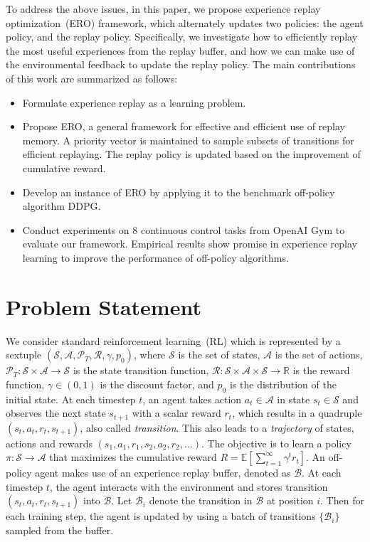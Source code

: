 \documentclass{article}
\begin{document}
To address the above issues, in this paper, we propose experience replay optimization~(ERO) framework, which alternately updates two policies: the agent policy, and the replay policy. Specifically, we investigate how to efficiently replay the most useful experiences from the replay buffer, and how we can make use of the environmental feedback to update the replay policy. The main contributions of this work are summarized as follows:

\begin{itemize}
  \item Formulate experience replay as a learning problem.
  \item Propose ERO, a general framework for effective and efficient use of replay memory. A priority vector is maintained to sample subsets of transitions for efficient replaying. The replay policy is updated based on the improvement of cumulative reward.
  \item Develop an instance of ERO by applying it to the benchmark off-policy algorithm DDPG.
  \item Conduct experiments on $8$ continuous control tasks from OpenAI Gym to evaluate our framework. Empirical results show promise in experience replay learning to improve the performance of off-policy algorithms.
\end{itemize}


\section{Problem Statement}
We consider standard reinforcement learning~(RL) which is represented by a sextuple $(\mathcal{S}, \mathcal{A}, \mathcal{P}_T, \mathcal{R}, \gamma, p_0)$, where $\mathcal{S}$ is the set of states, $\mathcal{A}$ is the set of actions, $\mathcal{P}_T: \mathcal{S} \times \mathcal{A} \to \mathcal{S}$ is the state transition function, $\mathcal{R}: \mathcal{S} \times \mathcal{A} \times \mathcal{S} \to \mathbb{R}$ is the reward function, $\gamma \in (0, 1)$ is the discount factor, and $p_0$ is the distribution of the initial state. At each timestep $t$, an agent takes action $a_t \in \mathcal{A}$ in state $s_t \in \mathcal{S}$ and observes the next state $s_{t+1}$ with a scalar reward $r_t$, which results in a quadruple $(s_t, a_t, r_t, s_{t+1})$, also called \emph{transition}. This also leads to a \emph{trajectory} of states, actions and rewards $(s_1, a_1, r_1, s_2, a_2, r_2, ...)$. The objective is to learn a policy $\pi: \mathcal{S} \to \mathcal{A}$ that maximizes the cumulative reward $R = \mathbb{E}[\sum_{t=1}^{\infty}\gamma^t r_t]$. An off-policy agent makes use of an experience replay buffer, denoted as $\mathcal{B}$. At each timestep $t$, the agent interacts with the environment and stores transition $(s_t, a_t, r_t, s_{t+1})$ into $\mathcal{B}$. Let $\mathcal{B}_i$ denote the transition in $\mathcal{B}$ at position $i$. Then for each training step, the agent is updated by using a batch of transitions $\{\mathcal{B}_i\}$ sampled from the buffer.
\end{document}
